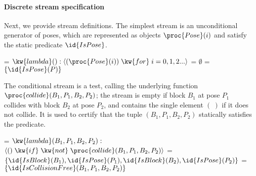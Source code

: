 \documentclass[letterpaper]{article} %
\theoremstyle{plain}\newtheorem{thm}{Theorem}
\theoremstyle{definition}\newtheorem{defn}{Definition}
\theoremstyle{plain}\newtheorem{lem}{Lemma}
\theoremstyle{plain}\newtheorem{cor}{Corollary}
\begin{document}
\paragraph{Discrete stream specification}

Next, we provide stream definitions.  The simplest stream is an
unconditional generator of poses, which are represented as objects
$\proc{Pose}(i)$ and satisfy the static predicate $\id{IsPose}$.

\begin{footnotesize}
\begin{codebox}
\zi {} = $\kw{lambda} (): \langle (\proc{Pose}(i)) \;\kw{for}\; i = 0, 1, 2 ... \rangle$
\zi {} = $\emptyset$
\zi {} = $\{\id{IsPose}(P)\}$
\end{codebox}
\end{footnotesize}

The conditional stream  is a test, calling the
underlying function $\proc{collide}(B_1, P_1, B_2, P_2)$;  the stream
is empty if block $B_1$ at pose $P_1$ collides with block $B_2$ at
pose $P_2$, and contains the single element $(\;)$ if it does not
collide.  It is used to certify that the tuple $(B_1, P_1, B_2, P_2)$
statically satisfies the  predicate.

\begin{footnotesize}
\begin{codebox}
\zi {} = $\kw{lambda} (B_1, P_1, B_2, P_2):$ 
\zi \>\>\> $\langle () \;\kw{if} \;\kw{not}\; \proc{collide}(B_1, P_1, B_2, P_2) \rangle$
\zi {} = $\{\id{IsBlock}(B_1), \id{IsPose}(P_1), \id{IsBlock}(B_2), \id{IsPose}(P_2)\}$
\zi {} = $\{\id{IsCollisionFree}(B_1, P_1, B_2, P_2)\}$
\end{codebox}
\end{footnotesize}
\end{document}
